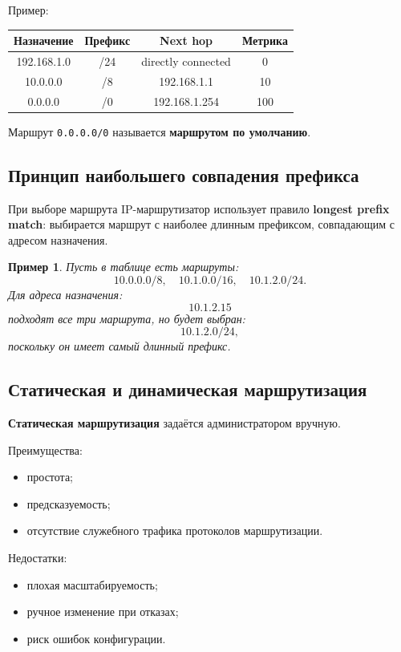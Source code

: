 \documentclass[12pt,a4paper]{article}
\newtheorem{example}{Пример}
\begin{document}
Пример:

\begin{center}
\begin{tabular}{|c|c|c|c|}
\hline
\textbf{Назначение} & \textbf{Префикс} & \textbf{Next hop} & \textbf{Метрика} \\
\hline
192.168.1.0 & /24 & directly connected & 0 \\
\hline
10.0.0.0 & /8 & 192.168.1.1 & 10 \\
\hline
0.0.0.0 & /0 & 192.168.1.254 & 100 \\
\hline
\end{tabular}
\end{center}

Маршрут \texttt{0.0.0.0/0} называется \textbf{маршрутом по умолчанию}.

\subsection{Принцип наибольшего совпадения префикса}

При выборе маршрута IP-маршрутизатор использует правило \textbf{longest prefix match}: выбирается маршрут с наиболее длинным префиксом, совпадающим с адресом назначения.

\begin{example}
Пусть в таблице есть маршруты:
\[
10.0.0.0/8,\quad 10.1.0.0/16,\quad 10.1.2.0/24.
\]
Для адреса назначения:
\[
10.1.2.15
\]
подходят все три маршрута, но будет выбран:
\[
10.1.2.0/24,
\]
поскольку он имеет самый длинный префикс.
\end{example}

\subsection{Статическая и динамическая маршрутизация}

\textbf{Статическая маршрутизация} задаётся администратором вручную.

Преимущества:
\begin{itemize}
    \item простота;
    \item предсказуемость;
    \item отсутствие служебного трафика протоколов маршрутизации.
\end{itemize}

Недостатки:
\begin{itemize}
    \item плохая масштабируемость;
    \item ручное изменение при отказах;
    \item риск ошибок конфигурации.
\end{itemize}
\end{document}
